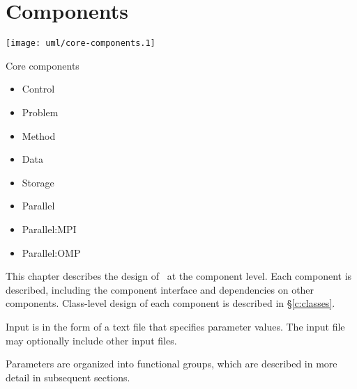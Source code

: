 \chapter{Components} \label{c:components}

\centerline{\texttt{[image: uml/core-components.1]}}

Core components

\begin{itemize}
\item Control
\item Problem
\item Method
\item Data
\item Storage
\end{itemize}

\begin{itemize}
\item Parallel
\item Parallel:MPI
\item Parallel:OMP
\end{itemize}


   This chapter describes the design of \cello\ at the component
   level.  Each component is described, including the component interface and dependencies on other components.  Class-level design of each component is described in \S\ref{c:classes}.


Input is in the form of a text file that specifies
   parameter values.  The input file may optionally include other
   input files.

   Parameters are organized into functional groups, which are described
   in more detail in subsequent sections.

